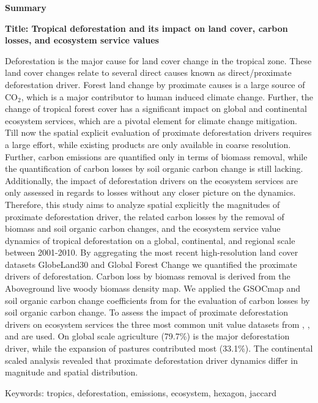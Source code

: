 \thispagestyle{empty}

\begin{center}
	\textbf{Summary}
\end{center}
	\textbf{Title: Tropical deforestation and its impact on land cover, carbon losses, and ecosystem service values}

	Deforestation is the major cause for land cover change in the tropical zone. These land cover changes relate to several direct causes known as direct/proximate deforestation driver. Forest land change by proximate causes is a large source of CO$_2$, which is a major contributor to human induced climate change. Further, the change of tropical forest cover has a significant impact on global and continental ecosystem services, which are a pivotal element for climate change mitigation. Till now the spatial explicit evaluation of proximate deforestation drivers requires a large effort, while existing products are only available in coarse resolution. Further, carbon emissions are quantified only in terms of biomass removal, while the quantification of carbon losses by soil organic carbon change is still lacking. Additionally, the impact of deforestation drivers on the ecosystem services are only assessed in regards to losses without any closer picture on the dynamics. Therefore, this study aims to analyze spatial explicitly the magnitudes of proximate deforestation driver, the related carbon losses by the removal of biomass and soil organic carbon changes, and the ecosystem service value dynamics of tropical deforestation on a global, continental, and regional scale between 2001-2010. By aggregating the most recent high-resolution land cover datasets GlobeLand30 and Global Forest Change we quantified the proximate drivers of deforestation. Carbon loss by biomass removal is derived from the Aboveground live woody biomass density map. We applied the GSOCmap and soil organic carbon change coefficients from \citet{Don2010} for the evaluation of carbon losses by soil organic carbon change. To assess the impact of proximate deforestation drivers on ecosystem services the three most common unit value datasets from \citet{Costanza2014}, \citet{Groot2012}, and \citet{Siikamaki2015} are used. On global scale agriculture (79.7\%) is the major deforestation driver, while the expansion of pastures contributed most (33.1\%). The continental scaled analysis revealed that proximate deforestation driver dynamics differ in magnitude and spatial distribution.

	Keywords: tropics, deforestation, emissions, ecosystem, hexagon, jaccard